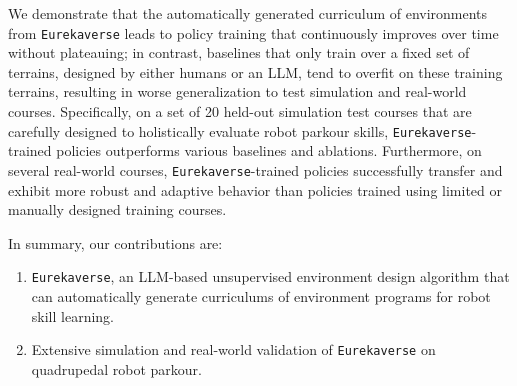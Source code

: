 \documentclass{article}
\newcommand{\ourmethod}{\texttt{Eurekaverse}\xspace}
\begin{document}
We demonstrate that the automatically generated curriculum of environments from \ourmethod leads to policy training that continuously improves over time without plateauing; in contrast, baselines that only train over a fixed set of terrains, designed by either humans or an LLM, tend to overfit on these training terrains, resulting in worse generalization to test simulation and real-world courses. Specifically, on a set of 20 held-out simulation test courses that are carefully designed to holistically evaluate robot parkour skills, \ourmethod-trained policies outperforms various baselines and ablations. Furthermore, on several real-world courses, \ourmethod-trained policies successfully transfer and exhibit more robust and adaptive behavior than policies trained using limited or manually designed training courses.

\newpage
In summary, our contributions are:
\begin{enumerate}[leftmargin=1em]
    \item \ourmethod, an LLM-based unsupervised environment design algorithm that can automatically generate curriculums of environment programs for robot skill learning.
    \item Extensive simulation and real-world validation of \ourmethod on quadrupedal robot parkour.
\end{enumerate}
\end{document}
